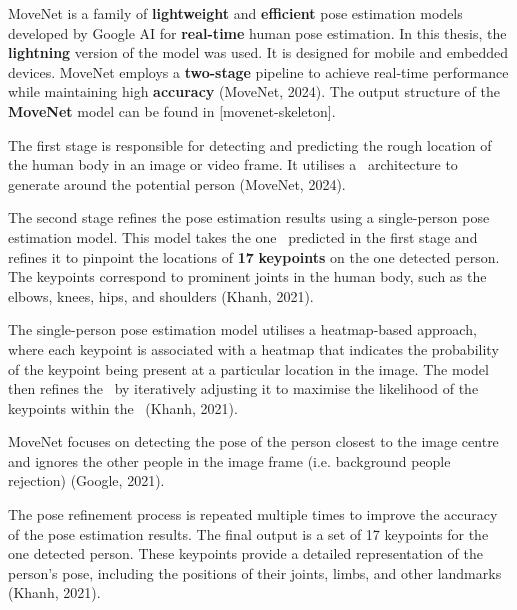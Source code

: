 
MoveNet is a family of {\bf lightweight} and {\bf efficient} pose estimation models developed by Google AI for {\bf real-time} human pose estimation. In this thesis, the {\bf lightning} version of the model was used. It is designed for mobile and embedded devices. MoveNet employs a {\bf two-stage} pipeline to achieve real-time performance while maintaining high {\bf accuracy} (\scc MoveNet, 2024). The output structure of the {\bf MoveNet} model can be found in [movenet-skeleton].

The first stage is responsible for detecting and predicting the rough location of the human body in an image or video frame. It utilises a \SSD\ architecture to generate {\bf \BBOX} around the potential person (\scc MoveNet, 2024).

The second stage refines the pose estimation results using a single-person pose estimation model. This model takes the one \BBOX\ predicted in the first stage and refines it to pinpoint the locations of {\bf 17} {\bf keypoints} on the one detected person. The keypoints correspond to prominent joints in the human body, such as the elbows, knees, hips, and shoulders (\scc Khanh, 2021).

The single-person pose estimation model utilises a heatmap-based approach, where each keypoint is associated with a heatmap that indicates the probability of the keypoint being present at a particular location in the image. The model then refines the \BBOX\ by iteratively adjusting it to maximise the likelihood of the keypoints within the \BBOX\ (\scc Khanh, 2021).

MoveNet focuses on detecting the pose of the person closest to the image centre and ignores the other people in the image frame (i.e. background people rejection) (\scc Google, 2021).

The pose refinement process is repeated multiple times to improve the accuracy of the pose estimation results. The final output is a set of 17 keypoints for the one detected person. These keypoints provide a detailed representation of the person's pose, including the positions of their joints, limbs, and other landmarks (\scc Khanh, 2021).

